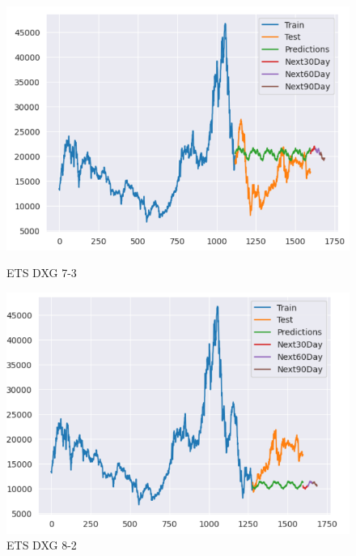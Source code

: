 \documentclass[conference]{IEEEtran}
\begin{document}
\begin{enumerate}
\begin{figure}[htbp]
    \begin{minipage}{0.23\textwidth}
    \centering
    \includegraphics[width=1\textwidth]{experiment/ets/TEAM4_ETS_DXG_7_3.png}
    \caption{ETS DXG 7-3}
    \label{fig:nvl_boxplot}
    \end{minipage}
    \hfill
    \begin{minipage}{0.23\textwidth}
    \centering
    \includegraphics[width=1\textwidth]{experiment/ets/TEAM4_ETS_DXG_8_2.png}
    \caption{ETS DXG 8-2}
    \label{fig:nvl_histogram}
    \end{minipage}
    \begin{minipage}{0.23\textwidth}
    \centering

\end{minipage}
\end{figure}
\end{enumerate}
\end{document}
